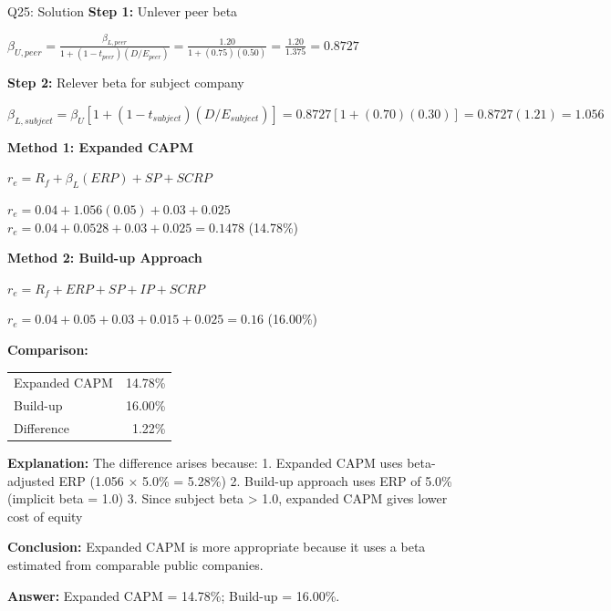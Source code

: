 \documentclass{beamer}
\renewcommand{\scriptsize}{\fontsize{6pt}{7pt}\selectfont}
\begin{document}
	\begin{frame}{Q25: Solution}
		\scriptsize
		\textbf{Step 1:} Unlever peer beta
		
		$\beta_{U,peer} = \frac{\beta_{L,peer}}{1 + (1-t_{peer})(D/E_{peer})} = \frac{1.20}{1 + (0.75)(0.50)} = \frac{1.20}{1.375} = 0.8727$
		
		\vspace{2pt}
		\textbf{Step 2:} Relever beta for subject company
		
		$\beta_{L,subject} = \beta_U[1 + (1-t_{subject})(D/E_{subject})] = 0.8727[1 + (0.70)(0.30)] = 0.8727(1.21) = 1.056$
		
		\vspace{2pt}
		\textbf{Method 1: Expanded CAPM}
		
		$r_e = R_f + \beta_L(ERP) + SP + SCRP$
		
		$r_e = 0.04 + 1.056(0.05) + 0.03 + 0.025$
		$r_e = 0.04 + 0.0528 + 0.03 + 0.025 = 0.1478$ (14.78\%)
		
		\vspace{2pt}
		\textbf{Method 2: Build-up Approach}
		
		$r_e = R_f + ERP + SP + IP + SCRP$
		
		$r_e = 0.04 + 0.05 + 0.03 + 0.015 + 0.025 = 0.16$ (16.00\%)
		
		\vspace{2pt}
		\textbf{Comparison:}
		\begin{tabular}{lr}
			Expanded CAPM & 14.78\% \\
			Build-up & 16.00\% \\
			Difference & 1.22\% \\
		\end{tabular}
		
		\vspace{2pt}
		\textbf{Explanation:} The difference arises because:
		1. Expanded CAPM uses beta-adjusted ERP (1.056 × 5.0\% = 5.28\%)
		2. Build-up approach uses ERP of 5.0\% (implicit beta = 1.0)
		3. Since subject beta > 1.0, expanded CAPM gives lower cost of equity
		
		\textbf{Conclusion:} Expanded CAPM is more appropriate because it uses a beta estimated from comparable public companies.
		
		\textbf{Answer:} Expanded CAPM = 14.78\%; Build-up = 16.00\%.
	\end{frame}
	
	
\end{document}
